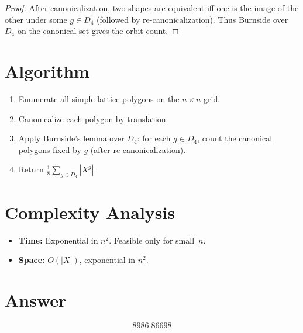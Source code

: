 \documentclass[11pt]{article}
\begin{document}
\begin{proof}
After canonicalization, two shapes are equivalent iff one is the image of the other under some $g \in D_4$ (followed by re-canonicalization). Thus Burnside over $D_4$ on the canonical set gives the orbit count.
\end{proof}

\section{Algorithm}

\begin{enumerate}
    \item Enumerate all simple lattice polygons on the $n \times n$ grid.
    \item Canonicalize each polygon by translation.
    \item Apply Burnside's lemma over $D_4$: for each $g \in D_4$, count the canonical polygons fixed by $g$ (after re-canonicalization).
    \item Return $\frac{1}{8}\sum_{g \in D_4}|X^g|$.
\end{enumerate}

\section{Complexity Analysis}

\begin{itemize}
    \item \textbf{Time:} Exponential in $n^2$. Feasible only for small~$n$.
    \item \textbf{Space:} $O(|X|)$, exponential in $n^2$.
\end{itemize}

\section{Answer}

\[
\boxed{8986.86698}
\]
\end{document}
